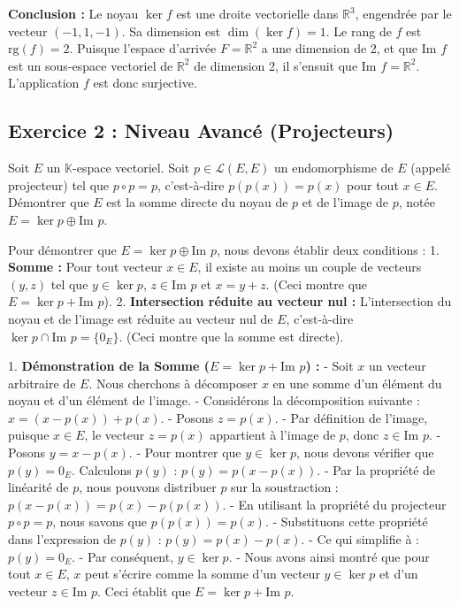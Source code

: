 \documentclass{report}
\begin{document}
\textbf{Conclusion :}
Le noyau $\ker f$ est une droite vectorielle dans $\mathbb{R}^3$, engendrée par le vecteur $(-1, 1, -1)$. Sa dimension est $\dim(\ker f) = 1$.
Le rang de $f$ est $\text{rg}(f) = 2$. Puisque l'espace d'arrivée $F = \mathbb{R}^2$ a une dimension de 2, et que $\text{Im } f$ est un sous-espace vectoriel de $\mathbb{R}^2$ de dimension 2, il s'ensuit que $\text{Im } f = \mathbb{R}^2$. L'application $f$ est donc surjective.

\subsection*{Exercice 2 : Niveau Avancé (Projecteurs)}
 Soit $E$ un $\mathbb{K}$-espace vectoriel. Soit $p \in \mathcal{L}(E, E)$ un endomorphisme de $E$ (appelé projecteur) tel que $p \circ p = p$, c'est-à-dire $p(p(x)) = p(x)$ pour tout $x \in E$. Démontrer que $E$ est la somme directe du noyau de $p$ et de l'image de $p$, notée $E = \ker p \oplus \text{Im } p$.

Pour démontrer que $E = \ker p \oplus \text{Im } p$, nous devons établir deux conditions :
1.  \textbf{Somme :} Pour tout vecteur $x \in E$, il existe au moins un couple de vecteurs $(y, z)$ tel que $y \in \ker p$, $z \in \text{Im } p$ et $x = y + z$. (Ceci montre que $E = \ker p + \text{Im } p$).
2.  \textbf{Intersection réduite au vecteur nul :} L'intersection du noyau et de l'image est réduite au vecteur nul de $E$, c'est-à-dire $\ker p \cap \text{Im } p = \{0_E\}$. (Ceci montre que la somme est directe).

1.  \textbf{Démonstration de la Somme ($E = \ker p + \text{Im } p$) :}
    -   Soit $x$ un vecteur arbitraire de $E$. Nous cherchons à décomposer $x$ en une somme d'un élément du noyau et d'un élément de l'image.
    -   Considérons la décomposition suivante :
        $x = (x - p(x)) + p(x)$.
    -   Posons $z = p(x)$.
    -   Par définition de l'image, puisque $x \in E$, le vecteur $z = p(x)$ appartient à l'image de $p$, donc $z \in \text{Im } p$.
    -   Posons $y = x - p(x)$.
    -   Pour montrer que $y \in \ker p$, nous devons vérifier que $p(y) = 0_E$. Calculons $p(y)$ :
        $p(y) = p(x - p(x))$.
    -   Par la propriété de linéarité de $p$, nous pouvons distribuer $p$ sur la soustraction :
        $p(x - p(x)) = p(x) - p(p(x))$.
    -   En utilisant la propriété du projecteur $p \circ p = p$, nous savons que $p(p(x)) = p(x)$.
    -   Substituons cette propriété dans l'expression de $p(y)$ :
        $p(y) = p(x) - p(x)$.
    -   Ce qui simplifie à :
        $p(y) = 0_E$.
    -   Par conséquent, $y \in \ker p$.
    -   Nous avons ainsi montré que pour tout $x \in E$, $x$ peut s'écrire comme la somme d'un vecteur $y \in \ker p$ et d'un vecteur $z \in \text{Im } p$. Ceci établit que $E = \ker p + \text{Im } p$.
\end{document}
